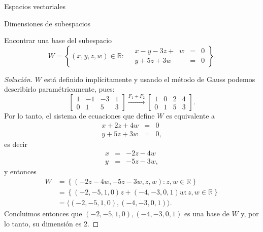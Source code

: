 \begin{chapter}{Espacios vectoriales}
\begin{section}{Dimensiones de subespacios}
        \begin{ejemplo*}
            Encontrar una base del subespacio 
            $$
            W = \left\{(x,y,z,w) \in \mathbb{R}: \quad\begin{array}{rcl}
            x-y -3z +\;\;w &=& 0 \\ y +5z +3w &=& 0
            \end{array} \right\}.
            $$
        \end{ejemplo*}
        \begin{proof}[Solución]
            $W$  está definido implícitamente y usando el método de Gauss podemos describirlo paramétricamente, pues:
            \begin{equation*}
            \begin{bmatrix}1&-1&-3&1 \\ 0&1&5&3  \end{bmatrix}
            \stackrel{F_1+F_2}{\longrightarrow} 
            \begin{bmatrix}1&0&2&4 \\ 0&1&5&3  \end{bmatrix}.
            \end{equation*}
            Por lo tanto, el sistema de ecuaciones que define $W$ es equivalente a 
            \begin{equation*}
            \begin{array}{rcl}
            x  +2z +4w &=& 0 \\ y +5z +3w &=& 0,
            \end{array}
            \end{equation*}
            es decir 
            \begin{equation*}
            \begin{array}{rcl}
            x  &=& -2z - 4w  \\ y &=& -5z -3w ,
            \end{array}
            \end{equation*}
            y entonces 
            \begin{align*}
            W &= \left\{(-2z -4w,-5z -3w,z,w) : z,w\in \mathbb{R} \right\} \\
            &= \left\{(-2,-5,1,0)z+(-4, -3,0,1)w : z,w\in \mathbb{R} \right\}\\
            &= \langle (-2,-5,1,0),(-4, -3,0,1)\rangle.
            \end{align*}
            Concluimos entonces que $(-2,-5,1,0),(-4, -3,0,1)$  es una base de $W$ y, por lo tanto,  su dimensión es 2.
        \end{proof}


\end{section}
\end{chapter}
